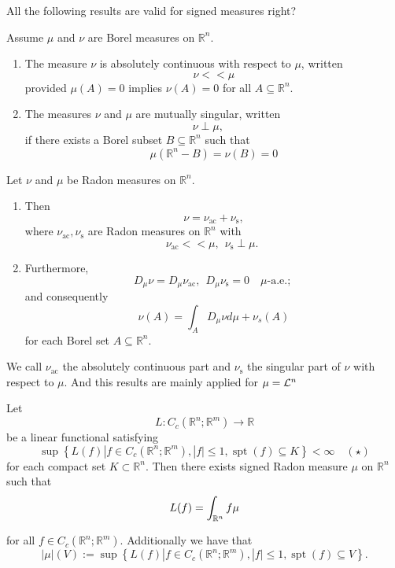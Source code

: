 \begin{question}
 All the following results are valid for signed measures right?
\end{question}
\begin{definition} Assume $\mu$ and $\nu$ are Borel measures on $\mathbb{R}^n$.
\begin{enumerate}
    \item The measure $\nu$ is absolutely continuous with respect to $\mu$, written
    $$\nu<<\mu$$
provided $\mu(A)=0$ implies $\nu(A)=0$ for all $A \subseteq \mathbb{R}^n$.
\item The measures $\nu$ and $\mu$ are mutually singular, written
$$\nu \perp \mu, \quad$$ 
if there exists a Borel subset $B \subseteq \mathbb{R}^n$ such that 
$$
\mu\left(\mathbb{R}^n-B\right)=\nu(B)=0
$$
\end{enumerate}
\end{definition}

\begin{theorem} Let $\nu$ and $\mu$ be Radon measures on $\mathbb{R}^n$.
\begin{enumerate}
    \item Then
$$
\nu=\nu_{\mathrm{ac}}+\nu_{\mathrm{s}},
$$
where $\nu_{\mathrm{ac}}, \nu_{\mathrm{s}}$ are Radon measures on $\mathbb{R}^n$ with
$$
\nu_{\mathrm{ac}}<<\mu,\ \  \nu_{\mathrm{s}} \perp \mu \text {. }
$$
\item Furthermore,
$$
D_\mu \nu=D_\mu \nu_{\mathrm{ac}},\ \  D_\mu \nu_{\mathrm{s}}=0 \quad \mu \text {-a.e.; }
$$
and consequently
$$
\nu(A)=\int_A D_\mu \nu d \mu+\nu_s(A)
$$
for each Borel set $A \subseteq \mathbb{R}^n$.
\end{enumerate}
\end{theorem}

\begin{definition}
We call $\nu_{\mathrm{ac}}$ the absolutely continuous part and $\nu_{\mathrm{s}}$ the singular part of $\nu$ with respect to $\mu$. And this results are mainly applied for $\mu={\mathcal L} ^n$
\end{definition} 

\begin{theorem} Let
$$
L: C_c\left(\mathbb{R}^n ; \mathbb{R}^m\right) \rightarrow \mathbb{R}
$$
be a linear functional satisfying
$$
\sup \left\{L(f)\left|f \in C_c\left(\mathbb{R}^n ; \mathbb{R}^m\right),\right| f \mid \leq 1, \operatorname{spt}(f) \subseteq K\right\}<\infty \quad(\star)
$$
for each compact set $K \subset \mathbb{R}^n$. Then there exists signed Radon measure $\mu$ on $\mathbb{R}^n$ such that
$$L(f) =\int_{\mathbb{R}^n} f \mu$$

for all $f \in C_c\left(\mathbb{R}^n ; \mathbb{R}^m\right)$.
Additionally we have that
$$
|\mu|(V):=\sup \left\{L(f)\left|f \in C_c\left(\mathbb{R}^n ; \mathbb{R}^m\right),\right| f \mid \leq 1, \operatorname{spt}(f) \subseteq V\right\} .
$$
\end{theorem}

